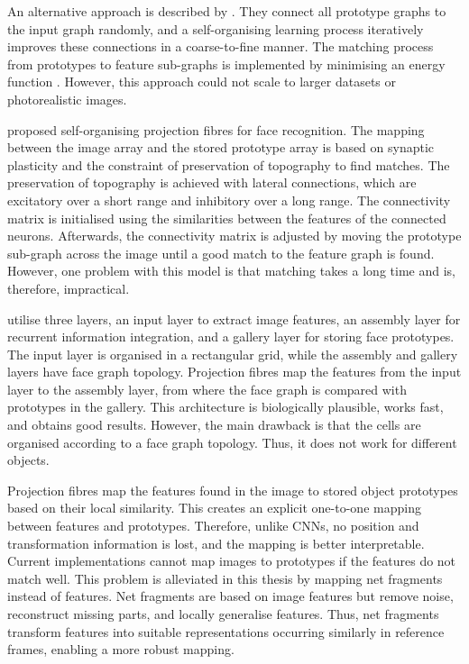 An alternative approach is described by . They connect all prototype graphs to the input graph randomly, and a self-organising learning process iteratively improves these connections in a coarse-to-fine manner.
The matching process from prototypes to feature sub-graphs is implemented by minimising an energy function .
However, this approach could not scale to larger datasets or photorealistic images.

 proposed self-organising projection fibres for face recognition. The mapping between the image array and the stored prototype array is based on synaptic plasticity and the constraint of preservation of topography to find matches. The preservation of topography is achieved with lateral connections, which are excitatory over a short range and inhibitory over a long range.
The connectivity matrix is initialised using the similarities between the features of the connected neurons. Afterwards, the connectivity matrix is adjusted by moving the prototype sub-graph across the image until a good match to the feature graph is found.
However, one problem with this model is that matching takes a long time and is, therefore, impractical.

 utilise three layers, an input layer to extract image features, an assembly layer for recurrent information integration, and a gallery layer for storing face prototypes.
The input layer is organised in a rectangular grid, while the assembly and gallery layers have face graph topology.
Projection fibres map the features from the input layer to the assembly layer, from where the face graph is compared with prototypes in the gallery.
This architecture is biologically plausible, works fast, and obtains good results. 
However, the main drawback is that the cells are organised according to a face graph topology. Thus, it does not work for different objects. 

Projection fibres map the features found in the image to stored object prototypes based on their local similarity. This creates an explicit one-to-one mapping between features and prototypes. Therefore, unlike CNNs, no position and transformation information is lost, and the mapping is better interpretable.
Current implementations cannot map images to prototypes if the features do not match well.
This problem is alleviated in this thesis by mapping net fragments  instead of features.
Net fragments are based on image features but remove noise, reconstruct missing parts, and locally generalise features. Thus, net fragments transform features into suitable representations occurring similarly in reference frames, enabling a more robust mapping.

